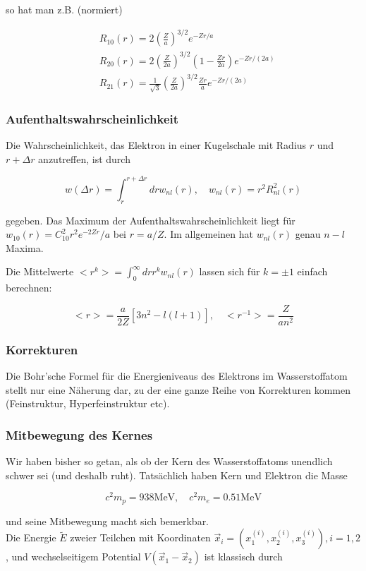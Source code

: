 \documentclass[10pt, letterpaper]{article}
\begin{document}
so hat man z.B. (normiert)

$$
\begin{aligned}
& R_{10}(r)=2\left(\frac{Z}{a}\right)^{3 / 2} e^{-Z r / a} \\
& R_{20}(r)=2\left(\frac{Z}{2 a}\right)^{3 / 2}\left(1-\frac{Z r}{2 a}\right) e^{-Z r /(2 a)} \\
& R_{21}(r)=\frac{1}{\sqrt{3}}\left(\frac{Z}{2 a}\right)^{3 / 2} \frac{Z r}{a} e^{-Z r /(2 a)}
\end{aligned}
$$

\subsubsection*{Aufenthaltswahrscheinlichkeit}
Die Wahrscheinlichkeit, das Elektron in einer Kugelschale mit Radius $r$ und $r+\Delta r$ anzutreffen, ist durch

$$
w(\Delta r)=\int_{r}^{r+\Delta r} d r w_{n l}(r), \quad w_{n l}(r)=r^{2} R_{n l}^{2}(r)
$$

gegeben. Das Maximum der Aufenthaltswahrscheinlichkeit liegt für $w_{10}(r)=C_{10}^{2} r^{2} e^{-2 Z r} / a$ bei $r=a / Z$. Im allgemeinen hat $w_{n l}(r)$ genau $n-l$ Maxima.

Die Mittelwerte $<r^{k}>=\int_{0}^{\infty} d r r^{k} w_{n l}(r)$ lassen sich für $k= \pm 1$ einfach berechnen:

$$
<r>=\frac{a}{2 Z}\left[3 n^{2}-l(l+1)\right], \quad<r^{-1}>=\frac{Z}{a n^{2}}
$$

\subsubsection*{Korrekturen}
Die Bohr'sche Formel für die Energieniveaus des Elektrons im Wasserstoffatom stellt nur eine Näherung dar, zu der eine ganze Reihe von Korrekturen kommen (Feinstruktur, Hyperfeinstruktur etc).

\subsubsection*{Mitbewegung des Kernes}
Wir haben bisher so getan, als ob der Kern des Wasserstoffatoms unendlich schwer sei (und deshalb ruht). Tatsächlich haben Kern und Elektron die Masse

$$
c^{2} m_{p}=938 \mathrm{MeV}, \quad c^{2} m_{e}=0.51 \mathrm{MeV}
$$

und seine Mitbewegung macht sich bemerkbar.\\
Die Energie $\tilde{E}$ zweier Teilchen mit Koordinaten $\vec{x}_{i}=\left(x_{1}^{(i)}, x_{2}^{(i)}, x_{3}^{(i)}\right), i=1,2$, und wechselseitigem Potential $V\left(\vec{x}_{1}-\vec{x}_{2}\right)$ ist klassisch durch
\end{document}
